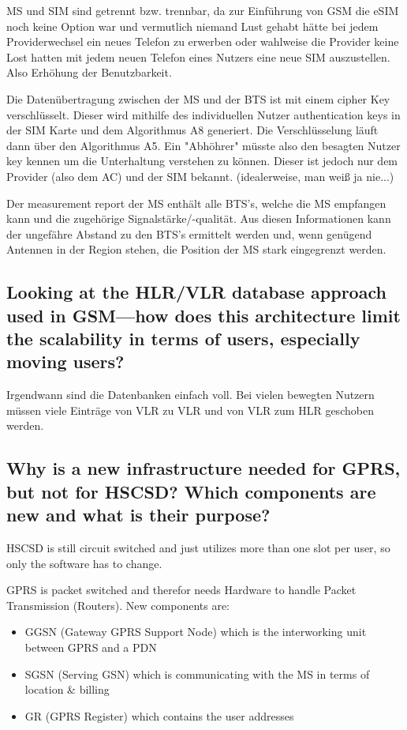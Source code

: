 MS und SIM sind getrennt bzw. trennbar, da zur Einführung von GSM die eSIM noch keine Option war und vermutlich niemand Lust gehabt hätte bei jedem Providerwechsel ein neues Telefon zu erwerben oder wahlweise die Provider keine Lost hatten mit jedem neuen Telefon eines Nutzers eine neue SIM auszustellen. Also Erhöhung der Benutzbarkeit.


Die Datenübertragung zwischen der MS und der BTS ist mit einem cipher Key verschlüsselt. Dieser wird mithilfe des individuellen Nutzer authentication keys in der SIM Karte und dem Algorithmus A8 generiert. Die Verschlüsselung läuft dann über den Algorithmus A5. Ein "Abhöhrer" müsste also den besagten Nutzer key kennen um die Unterhaltung verstehen zu können. Dieser ist jedoch nur dem Provider (also dem AC) und der SIM bekannt. (idealerweise, man weiß ja nie...)

Der measurement report der MS enthält alle BTS's, welche die MS empfangen kann und die zugehörige Signalstärke/-qualität. Aus diesen Informationen kann der ungefähre Abstand zu den BTS's ermittelt werden und, wenn genügend Antennen in der Region stehen, die Position der MS stark eingegrenzt werden.



\subsection{Looking at the HLR/VLR database approach used in GSM—how does this
architecture limit the scalability in terms of users, especially moving users?}

Irgendwann sind die Datenbanken einfach voll. 
Bei vielen bewegten Nutzern müssen viele Einträge von VLR zu VLR und von VLR zum HLR geschoben werden.

\subsection{Why is a new infrastructure needed for GPRS, but not for HSCSD? Which
components are new and what is their purpose?}

HSCSD is still circuit switched and just utilizes more than one slot per user, so only the software has to change. 

GPRS is packet switched and therefor needs Hardware to handle Packet Transmission (Routers).
New components are:
\begin{itemize}

\item GGSN (Gateway GPRS Support Node) which is the interworking unit between GPRS and a PDN

\item SGSN (Serving GSN) which is communicating with the MS in terms of location & billing

\item GR (GPRS Register) which contains the user addresses
\end{itemize}


